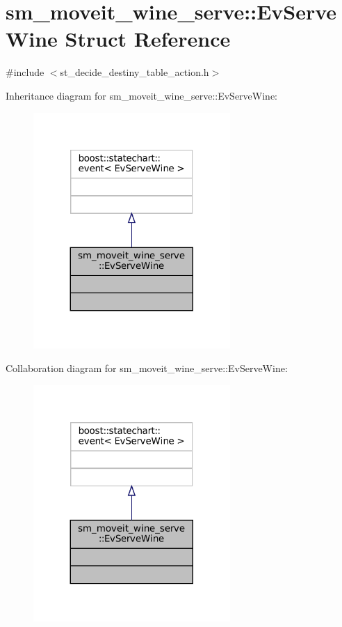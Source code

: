 \hypertarget{structsm__moveit__wine__serve_1_1EvServeWine}{}\section{sm\+\_\+moveit\+\_\+wine\+\_\+serve\+:\+:Ev\+Serve\+Wine Struct Reference}
\label{structsm__moveit__wine__serve_1_1EvServeWine}


{\ttfamily \#include $<$st\+\_\+decide\+\_\+destiny\+\_\+table\+\_\+action.\+h$>$}



Inheritance diagram for sm\+\_\+moveit\+\_\+wine\+\_\+serve\+:\+:Ev\+Serve\+Wine\+:
\nopagebreak
\begin{figure}[H]
\begin{center}
\leavevmode
\includegraphics[width=212pt]{structsm__moveit__wine__serve_1_1EvServeWine__inherit__graph}
\end{center}
\end{figure}


Collaboration diagram for sm\+\_\+moveit\+\_\+wine\+\_\+serve\+:\+:Ev\+Serve\+Wine\+:
\nopagebreak
\begin{figure}[H]
\begin{center}
\leavevmode
\includegraphics[width=212pt]{structsm__moveit__wine__serve_1_1EvServeWine__coll__graph}
\end{center}
\end{figure}



